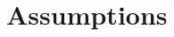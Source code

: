 \documentclass[modern]{aastex63}
\newcommand{\gaia}{\textsl{Gaia}}
\newcommand{\galah}{\acronym{GALAH}}
\begin{document}



\section{Assumptions}
\end{document}
